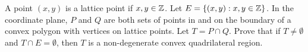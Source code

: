 A point $(x,y)$ is a lattice point if $x,y\in\Bbb Z$. Let $E=\{(x,y):x,y\in\Bbb Z\}$. In the coordinate plane, $P$ and $Q$ are both sets of points in and on the boundary of a convex polygon with vertices on lattice points. Let $T=P\cap Q$. Prove that if $T\ne\emptyset$ and $T\cap E=\emptyset$,  then $T$ is a  non-degenerate convex quadrilateral region.